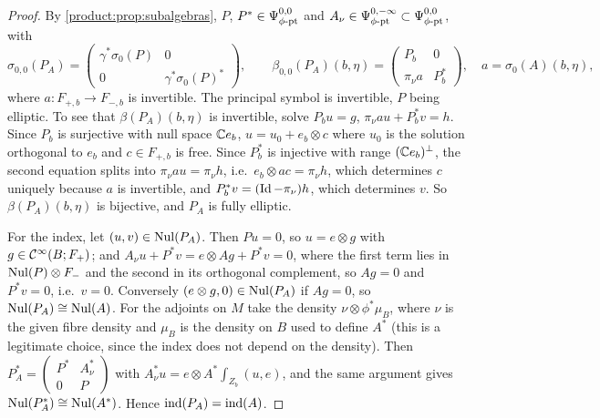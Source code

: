 \begin{proof}
By \cref{product:prop:subalgebras}, $P$, $P^*\in\Psi^{0,0}_{\phi\text{-}\mathrm{pt}}$ and
$A_\nu\in\Psi^{0,-\infty}_{\phi\text{-}\mathrm{pt}}\subset\Psi^{0,0}_{\phi\text{-}\mathrm{pt}}$, with
\begin{equation*}
\sigma_{0,0}(P_A)=\begin{pmatrix}\gamma^*\sigma_0(P)&0\\0&\gamma^*\sigma_0(P)^*
\end{pmatrix},\qquad
\beta_{0,0}(P_A)(b,\eta)=\begin{pmatrix}P_b&0\\ \pi_\nu a&P_b^*\end{pmatrix},\quad
a=\sigma_0(A)(b,\eta),
\end{equation*}
where $a:F_{+,b}\longrightarrow F_{-,b}$ is invertible. The principal symbol is
invertible, $P$ being elliptic. To see that $\beta(P_A)(b,\eta)$ is invertible,
solve $P_bu=g$, $\pi_\nu au+P_b^*v=h$. Since $P_b$ is surjective with null space
$\mathbb{C} e_b$, $u=u_0+e_b\otimes c$ where $u_0$ is the solution orthogonal to $e_b$ and
$c\in F_{+,b}$ is free. Since $P_b^*$ is injective with range $(\mathbb{C} e_b)^\perp$, the
second equation splits into $\pi_\nu au=\pi_\nu h$, i.e.\
$e_b\otimes ac=\pi_\nu h$, which determines $c$ uniquely because $a$ is
invertible, and $P_b^*v=(\operatorname{Id}-\pi_\nu)h$, which determines $v$. So
$\beta(P_A)(b,\eta)$ is bijective, and $P_A$ is fully elliptic.

For the index, let $(u,v)\in\operatorname{Nul}(P_A)$. Then $Pu=0$, so $u=e\otimes g$ with
$g\in\mathcal{C}^\infty(B;F_+)$; and $A_\nu u+P^*v=e\otimes Ag+P^*v=0$, where the first term lies in
$\operatorname{Nul}(P)\otimes F_-$ and the second in its orthogonal complement, so $Ag=0$ and
$P^*v=0$, i.e.\ $v=0$. Conversely $(e\otimes g,0)\in\operatorname{Nul}(P_A)$ if $Ag=0$, so
$\operatorname{Nul}(P_A)\cong\operatorname{Nul}(A)$. For the adjoints on $M$ take the density
$\nu\otimes\phi^*\mu_B$, where $\nu$ is the given fibre density and $\mu_B$ is the
density on $B$ used to define $A^*$ (this is a legitimate choice, since the index
does not depend on the density). Then
$P_A^*=\begin{pmatrix}P^*&A_\nu^*\\0&P\end{pmatrix}$ with $A_\nu^*u=e\otimes
A^*\int_{Z_b}(u,e)$, and the same argument gives $\operatorname{Nul}(P_A^*)\cong\operatorname{Nul}(A^*)$. Hence
$\operatorname{ind}(P_A)=\operatorname{ind}(A)$.
\end{proof}


